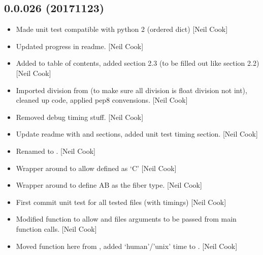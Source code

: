 \documentclass[a4paper,10pt,english]{report}
\begin{document}
\subsection{0.0.026 (2017\sphinxhyphen{}11\sphinxhyphen{}23)}
\label{\detokenize{misc/changelog:id544}}\begin{itemize}
\item {} 
Made unit test compatible with python 2 (ordered dict) {[}Neil Cook{]}

\item {} 
Updated progress in readme. {[}Neil Cook{]}

\item {} 
Added to table of contents, added section 2.3 (to be filled out like
section 2.2) {[}Neil Cook{]}

\item {} 
Imported division from  (to make sure all division is float
division not int), cleaned up code, applied pep8 convensions. {[}Neil
Cook{]}

\item {} 
Removed debug timing stuff. {[}Neil Cook{]}

\item {} 
Update readme with  and  sections, added unit test
timing section. {[}Neil Cook{]}

\item {} 
Renamed  to . {[}Neil Cook{]}

\item {} 
Wrapper around  to allow  defined as
‘C’ {[}Neil Cook{]}

\item {} 
Wrapper around  to define AB as the fiber type.
{[}Neil Cook{]}

\item {} 
First commit \sphinxhyphen{} unit test for all tested files (with timings) {[}Neil
Cook{]}

\item {} 
Modified  function to allow  and files
arguments to be passed from main function calls. {[}Neil Cook{]}

\item {} 
Moved  function here from , added
‘human’/’unix’ time to . {[}Neil Cook{]}


\end{itemize}
\end{document}
